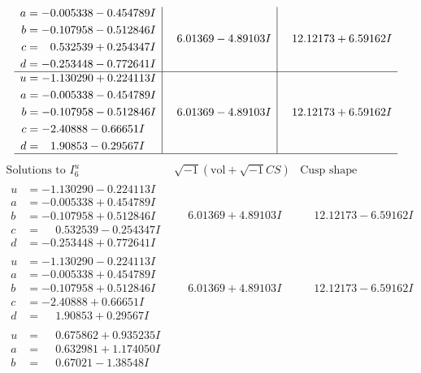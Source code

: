 \documentclass[1p]{elsarticle_modified}
\theoremstyle{definition}
\newcommand{\I}{\sqrt{-1}}
\begin{document}
$$\begin{array}{c|c|c}
\begin{aligned}
a &= -0.005338 - 0.454789 I \\
b &= -0.107958 - 0.512846 I \\
c &= \phantom{-}0.532539 + 0.254347 I \\
d &= -0.253448 - 0.772641 I\end{aligned}
 & \phantom{-}6.01369 - 4.89103 I & \phantom{-}12.12173 + 6.59162 I \\ \hline\begin{aligned}
u &= -1.130290 + 0.224113 I \\
a &= -0.005338 - 0.454789 I \\
b &= -0.107958 - 0.512846 I \\
c &= -2.40888 - 0.66651 I \\
d &= \phantom{-}1.90853 - 0.29567 I\end{aligned}
 & \phantom{-}6.01369 - 4.89103 I & \phantom{-}12.12173 + 6.59162 I\\
 \hline 
 \end{array}$$\newpage$$\begin{array}{c|c|c}  
\text{Solutions to }I^u_{6}& \I (\text{vol} + \sqrt{-1}CS) & \text{Cusp shape}\\
 \hline 
\begin{aligned}
u &= -1.130290 - 0.224113 I \\
a &= -0.005338 + 0.454789 I \\
b &= -0.107958 + 0.512846 I \\
c &= \phantom{-}0.532539 - 0.254347 I \\
d &= -0.253448 + 0.772641 I\end{aligned}
 & \phantom{-}6.01369 + 4.89103 I & \phantom{-}12.12173 - 6.59162 I \\ \hline\begin{aligned}
u &= -1.130290 - 0.224113 I \\
a &= -0.005338 + 0.454789 I \\
b &= -0.107958 + 0.512846 I \\
c &= -2.40888 + 0.66651 I \\
d &= \phantom{-}1.90853 + 0.29567 I\end{aligned}
 & \phantom{-}6.01369 + 4.89103 I & \phantom{-}12.12173 - 6.59162 I \\ \hline\begin{aligned}
u &= \phantom{-}0.675862 + 0.935235 I \\
a &= \phantom{-}0.632981 + 1.174050 I \\
b &= \phantom{-}0.67021 - 1.38548 I \\

\end{aligned}
\end{array}$$
\end{document}
